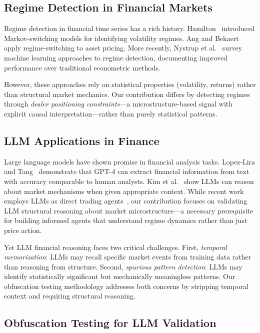 \subsection{Regime Detection in Financial Markets}

Regime detection in financial time series has a rich history. Hamilton~\cite{hamilton1989new} introduced Markov-switching models for identifying volatility regimes. Ang and Bekaert~\cite{ang2002regime} apply regime-switching to asset pricing. More recently, Nystrup et al.~\cite{nystrup2020regime} survey machine learning approaches to regime detection, documenting improved performance over traditional econometric methods.

However, these approaches rely on statistical properties (volatility, returns) rather than structural market mechanics. Our contribution differs by detecting regimes through \textit{dealer positioning constraints}—a microstructure-based signal with explicit causal interpretation—rather than purely statistical patterns.

\subsection{LLM Applications in Finance}

Large language models have shown promise in financial analysis tasks. Lopez-Lira and Tang~\cite{lopez2023can} demonstrate that GPT-4 can extract financial information from text with accuracy comparable to human analysts. Kim et al.~\cite{kim2024financial} show LLMs can reason about market mechanisms when given appropriate context. While recent work employs LLMs as direct trading agents~\cite{yang2024tradingagents}, our contribution focuses on validating LLM structural reasoning about market microstructure---a necessary prerequisite for building informed agents that understand regime dynamics rather than just price action.

Yet LLM financial reasoning faces two critical challenges. First, \textit{temporal memorization}: LLMs may recall specific market events from training data rather than reasoning from structure. Second, \textit{spurious pattern detection}: LLMs may identify statistically significant but mechanically meaningless patterns. Our obfuscation testing methodology addresses both concerns by stripping temporal context and requiring structural reasoning.

\subsection{Obfuscation Testing for LLM Validation}

